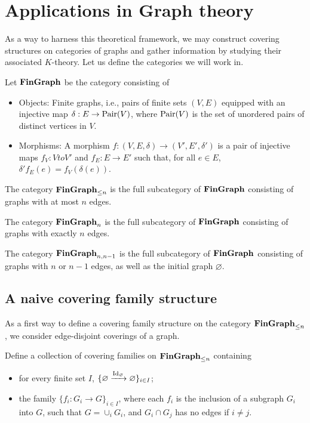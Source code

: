 \section{Applications in Graph theory}
As a way to harness this theoretical framework, we may construct covering structures on categories of graphs and gather information by studying their associated $K$-theory. Let us define the categories we will work in.

\begin{definition}
    Let $\textbf{FinGraph}$ be the category consisting of
    \begin{itemize}
        \item Objects: Finite graphs, i.e., pairs of finite sets $(V,E)$ equipped with an injective map $\delta: E \to \textnormal{Pair}\lparen V \rparen$, where $\textnormal{Pair}\lparen V \rparen$ is the set of unordered pairs of distinct vertices in $V$.
        \item Morphisms: A morphism $f : (V,E,\delta) \to (V',E', \delta')$ is a pair of injective maps $f_V : V to V'$ and $f_E : E \to E'$ such that, for all $e \in E$, $\delta'f_E(e) = f_V(\delta(e))$.
    \end{itemize}
    The category $\textbf{FinGraph}_{\leq n}$ is the full subcategory of $\textbf{FinGraph}$ consisting of graphs with at most $n$ edges.

    The category $\textbf{FinGraph}_{n}$ is the full subcategory of $\textbf{FinGraph}$ consisting of graphs with exactly $n$ edges.
    
    The category $\textbf{FinGraph}_{n, n-1}$ is the full subcategory of $\textbf{FinGraph}$ consisting of graphs with $n$ or $n-1$ edges, as well as the initial graph $\varnothing$.
\end{definition}

\subsection{A naive covering family structure}
As a first way to define a covering family structure on the category $\textbf{FinGraph}_{\leq n}$, we consider edge-disjoint coverings of a graph.

\begin{definition}
    Define a collection of covering families on $\textbf{FinGraph}_{\leq n}$ containing
    \begin{itemize}
        \item for every finite set $I$, $\{\varnothing \xrightarrow{\textnormal{Id}_{\varnothing}} \varnothing\}_{i \in I}$;
        \item the family $\{f_i : G_i \to G\}_{i \in I}$, where each $f_i$ is the inclusion of a subgraph $G_i$ into $G$, such that $G = \cup_i G_i$, and $G_i \cap G_j$ has no edges if $i \neq j$.
    \end{itemize}
\end{definition}

